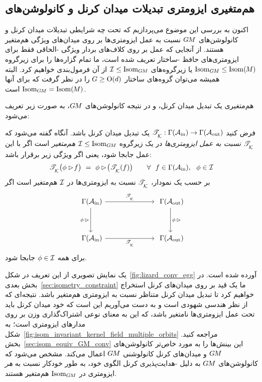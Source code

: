 

\subsection{هم‌متغیری ایزومتری تبدیلات میدان کرنل و کانولوشن‌های }
\label{sec:isometry_equivariance}


اکنون به بررسی این موضوع می‌پردازیم که تحت چه شرایطی تبدیلات میدان کرنل و کانولوشن‌های $G\mkern-1.4muM$ نسبت به عمل ایزومتری‌ها بر روی میدان‌های ویژگی هم‌متغیر هستند.
از آنجایی که عمل بر روی کلاف‌های بردار ویژگی -الحاقی فقط برای ایزومتری‌های حافظ -ساختار تعریف شده است، ما تمام گزاره‌ها را برای زیرگروه $\operatorname{Isom}_{G\mkern-1.4muM} \leq \operatorname{Isom}(\mkern-1.5mu M \mkern-.5mu)$ یا زیرگروه‌های $\mathcal{I} \leq \operatorname{Isom}_{G\mkern-1.4muM}$ از آن فرمول‌بندی خواهیم کرد.
البته همیشه می‌توان گروه‌های ساختار $G\geq\operatorname{O}(d)$ را در نظر گرفت که برای آنها $\operatorname{Isom}_{G\mkern-1.4muM} = \operatorname{Isom}(\mkern-1.5mu M \mkern-.5mu)$ است.


هم‌متغیری یک تبدیل میدان کرنل، و در نتیجه کانولوشن‌های $G\mkern-1.4muM$، به صورت زیر تعریف می‌شود:
\begin{dfn}
\label{dfn:isometry_equivariance}
    فرض کنید ${\mathscr{T}_{\overset{}{\mkern-0mu \mathcal{K}}}: \Gamma(\mathcal{A}_\textup{in}) \to \Gamma(\mathcal{A}_\textup{out})}$ یک تبدیل میدان کرنل باشد.
    آنگاه گفته می‌شود که $\mathscr{T}_{\overset{}{\mkern-0mu \mathcal{K}}}$ \emph{نسبت به عمل ایزومتری‌ها} در یک زیرگروه $\mathcal{I} \leq \operatorname{Isom}_{G\mkern-1.4muM}$ \emph{هم‌متغیر} است اگر با این عمل جابجا شود، یعنی اگر ویژگی زیر برقرار باشد:
    \begin{align}\label{eq:isom_equivariance_kernel_field_trafo_def}
        \mathscr{T}_{\overset{}{\mkern-0mu \mathcal{K}}} \big( \phi\rhd\!f \big) \ =\ \phi\rhd\! \big( \mathscr{T}_{\overset{}{\mkern-0mu \mathcal{K}}}(f) \big)
        \qquad \forall\ \ f\in\Gamma(\mathcal{A}_\textup{in}), \ \ \phi\in \mathcal{I}
    \end{align}
    بر حسب یک نمودار، $\mathscr{T}_{\overset{}{\mkern-0mu \mathcal{K}}}$ نسبت به ایزومتری‌ها در $\mathcal{I}$ هم‌متغیر است اگر
    \begin{equation}
    \begin{tikzcd}[column sep=70pt, row sep=35, font=\normalsize]
        \Gamma(\Ain)
            \arrow[r, "\TK"]
            \arrow[d, "\phi\,\rhd"']
        &
        \Gamma(\Aout)
            \arrow[d, "\phi\,\rhd"]
        \\
        \Gamma(\Ain)
            \arrow[r, "\TK"']
        &
        \Gamma(\Aout)
    \end{tikzcd}
    \end{equation}
    برای همه $\phi \in \mathcal{I}$ جابجا شود.
\end{dfn}
یک نمایش تصویری از این تعریف در شکل~\ref{fig:lizard_conv_egg} آورده شده است.
در بخش بعدی~\ref{sec:isometry_constraint} ما یک قید بر روی میدان‌های کرنل استخراج خواهیم کرد تا تبدیل میدان کرنل متناظر نسبت به ایزومتری هم‌متغیر باشد.
نتیجه‌ای که از نظر هندسی شهودی است و به دست می‌آوریم این است که خود میدان کرنل باید تحت عمل ایزومتری‌ها نامتغیر باشد، که این به معنای نوعی اشتراک‌گذاری وزن بر روی مدارهای ایزومتری است؛ به شکل~\ref{fig:isom_invariant_kernel_field_multiple_orbits} مراجعه کنید.
بخش~\ref{sec:isom_equiv_GM_conv} این بینش‌ها را به مورد خاص‌تر کانولوشن‌های $G\mkern-1.4muM$ و میدان‌های کرنل کانولوشنی $G\mkern-1.4muM$ اعمال می‌کند.
مشخص می‌شود که کانولوشن‌های $G\mkern-1.4muM$ به دلیل -هدایت‌پذیری کرنل الگوی خود، به طور خودکار نسبت به \emph{هر} ایزومتری در $\operatorname{Isom}_{G\mkern-1.4muM}$ هم‌متغیر هستند.








